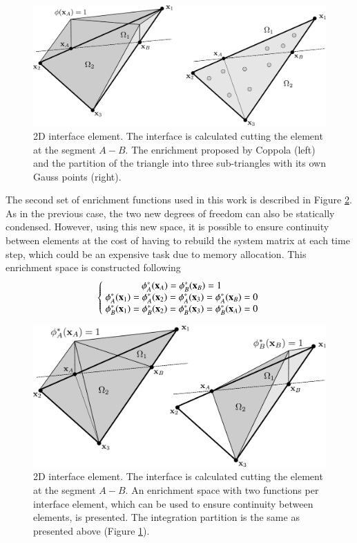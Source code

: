 \begin{figure}[H]
  \centering
  \includegraphics[width=.98\columnwidth]{images/enrichment1_r1.pdf}
   \caption{2D interface element. The interface is calculated cutting the element at the segment $A-B$. The enrichment proposed by Coppola (left) and the partition of the triangle into three sub-triangles with its own Gauss points (right).}
   \label{fg:enrichment1}                %
\end{figure}

The second set of enrichment functions used in this work is described in Figure \ref{fg:enrichment2}. As in the previous case, the two new degrees of freedom can also be statically condensed. However, using this new space, it is possible to ensure continuity between elements at the cost of having to rebuild the system matrix at each time step, which could be an expensive task due to memory allocation.
This enrichment space is constructed following
\begin{equation}
   \left\{\;
   \begin{matrix}
     \phi_A^*(\mathbf{x}_A)=\phi_B^*(\mathbf{x}_B)=1 \\
     \phi_A^*(\mathbf{x}_1)=\phi_A^*(\mathbf{x}_2)=\phi_A^*(\mathbf{x}_3)=\phi_A^*(\mathbf{x}_B)=0 \\
     \phi_B^*(\mathbf{x}_1)=\phi_B^*(\mathbf{x}_2)=\phi_B^*(\mathbf{x}_3)=\phi_B^*(\mathbf{x}_A)=0
   \end{matrix}\;
   \right.
   \label{eq:enrich-2a}
\end{equation}

\begin{figure}[H]
  \centering
   \includegraphics[width=.9\columnwidth]{images/enrichment2_r1.pdf}
   \caption{2D interface element. The interface is calculated cutting the element at the segment $A-B$. An enrichment space with two functions per interface element, which can be used to ensure continuity between elements, is presented. The integration partition is the same as presented above (Figure \ref{fg:enrichment1}).}
   \label{fg:enrichment2}
\end{figure}

